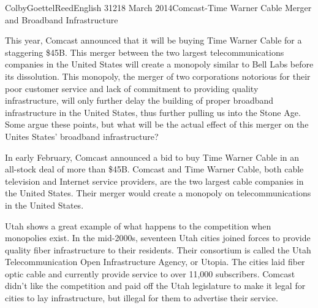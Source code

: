 \documentclass[12pt]{article}
\begin{document}
\begin{mla}{Colby}{Goettel}{Reed}{English 312}{18 March 2014}{Comcast-Time Warner Cable Merger and Broadband Infrastructure}

This year, Comcast announced that it will be buying Time Warner Cable for a staggering \$45B. This merger between the two largest telecommunications companies in the United States will create a monopoly similar to Bell Labs before its dissolution. This monopoly, the merger of two corporations notorious for their poor customer service and lack of commitment to providing quality infrastructure, will only further delay the building of proper broadband infrastructure in the United States, thus further pulling us into the Stone Age. Some argue these points, but what will be the actual effect of this merger on the Unites States' broadband infrastructure?

In early February, Comcast announced a bid to buy Time Warner Cable in an all-stock deal of more than \$45B. Comcast and Time Warner Cable, both cable television and Internet service providers, are the two largest cable companies in the United States. Their merger would create a monopoly on telecommunications in the United States.





Utah shows a great example of what happens to the competition when monopolies exist. In the mid-2000s, seventeen Utah cities joined forces to provide quality fiber infrastructure to their residents. Their consortium is called the Utah Telecommunication Open Infrastructure Agency, or Utopia. The cities laid fiber optic cable and currently provide service to over 11,000 subscribers. Comcast didn't like the competition and paid off the Utah legislature to make it legal for cities to lay infrastructure, but illegal for them to advertise their service.


\end{mla}
\end{document}
